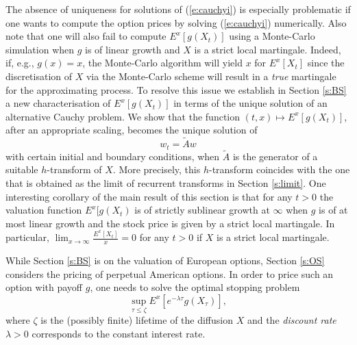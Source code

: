 \documentclass[11pt,reqno]{amsart}
\numberwithin{equation}{section}
\def\rar{\rightarrow}
\begin{document}
The absence of uniqueness for solutions of (\ref{e:cauchyi}) is  especially problematic if one wants to compute the option prices by solving (\ref{e:cauchyi}) numerically.    Also note that one will also fail to compute $E^x[g(X_t)]$ using a Monte-Carlo simulation when $g$ is of linear growth and $X$ is a strict local martingale. Indeed, if, e.g.,  $g(x)=x$, the Monte-Carlo algorithm will yield $x$ for $E^x[X_t]$ since the discretisation of $X$ via the Monte-Carlo scheme will result in a {\em true} martingale for the approximating process. To resolve this issue  we establish in Section \ref{s:BS} a new characterisation of $E^x[g(X_t)]$   in terms of the unique solution of an alternative Cauchy problem. We show that the function $(t,x) \mapsto E^x[g(X_t)]$, after an appropriate scaling, becomes the unique solution of 
\[
w_t= \tilde{A}w
\]
with certain initial and boundary conditions, when $\tilde{A}$ is the generator of a suitable $h$-transform of $X$. More precisely, this $h$-transform coincides with the  one that is obtained as the limit of recurrent transforms in Section \ref{s:limit}. One interesting corollary of the main result of this section  is that for any $t>0$ the valuation function $E^x[g(X_t)$ is of strictly sublinear growth at $\infty$ when $g$ is of at most linear growth and the stock price is given by a strict local martingale. In particular, $\lim_{x \rar \infty}\frac{E^x[X_t]}{x}=0$ for any $t>0$ if $X$ is a strict local martingale.

While Section \ref{s:BS} is on the valuation of European options, Section \ref{s:OS} considers the pricing of perpetual American options. In order to price such an option with payoff $g$, one needs to solve the optimal stopping problem
\[
\sup_{\tau \leq \zeta}E^x\left[e^{-\lambda \tau}g(X_{\tau})\right],
\]
where $\zeta$ is the (possibly finite) lifetime of the diffusion $X$ and the {\em discount rate} $\lambda>0$ corresponds to the constant interest rate.
\end{document}

